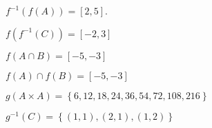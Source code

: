 \begin{multicols}{2}
\begin{list}{\bf{\ref{exer:sec91-2}.}}
\item \begin{list}{\bf{(b)}}
\item $f^{-1} \left( f ( A ) \right) = \left[ 2, 5 \right]$.
\end{list}
\end{list}

\begin{list}{}
\item \begin{list}{\bf{(d)}}
\item $f ( f^{-1} ( C ) ) = \left[ -2, 3 \right]$
\end{list}
\end{list}

\begin{list}{}
\item \begin{list}{\bf{(e)}}
\item $f ( A \cap B ) = \left[ -5, -3 \right]$
\end{list}
\end{list}

\begin{list}{}
\item \begin{list}{\bf{(f)}}
\item $f ( A ) \cap f ( B ) = \left[ -5, -3 \right]$
\end{list}
\end{list}
\end{multicols}

\begin{list}{\bf{\ref{exer:sec91-3}.}}
\item \begin{list}{\bf{(a)}}
\item $g ( A \times A ) = \left\{6, 12, 18, 24, 36, 54, 72, 108, 216 \right\}$
\end{list}
\end{list}

\begin{list}{}
\item \begin{list}{\bf{(b)}}
\item $g^{-1} ( C ) = \left\{ ( 1, 1 ), ( 2, 1 ), 
( 1, 2 ) \right\}$
\end{list}
\end{list}

